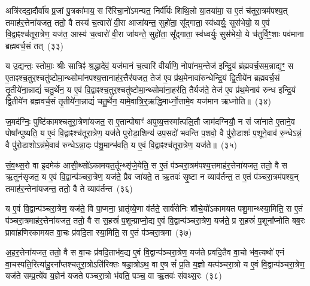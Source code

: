 {\anuvakamend[{लो॒कान्ग॑मयति॒ सावि॑द्वान्थ्सु॒शेवा॒ मावि॑श॒ यज॑मानं॒ द्वाद॑श च}]}

अत्रि॑रददा॒दौर्वा॑य प्र॒जां पु॒त्रका॑माय॒ स रि॑रिचा॒नो॑\-ऽमन्यत॒ निर्वी᳚र्यः शिथि॒लो या॒तया॑मा॒ स ए॒तं च॑तूरा॒त्रम॑पश्य॒त् तमाह॑र॒त्तेना॑यजत॒ ततो॒ वै तस्य॑ च॒त्वारो॑ वी॒रा आजा॑यन्त॒ सुहो॑ता॒ सू᳚द्गाता॒ स्व॑ध्वर्युः॒ सुस॑भेयो॒ य ए॒वं वि॒द्वाꣴश्च॑तूरा॒त्रेण॒ यज॑त॒ आस्य॑ च॒त्वारो॑ वी॒रा जा॑यन्ते॒ सुहो॑ता॒ सू᳚द्गाता॒ स्व॑ध्वर्युः॒ सुस॑भेयो॒ ये च॑तुर्वि॒ꣳ॒शाः पव॑माना ब्रह्मवर्च॒सं तत्~(३३)\ip

य उ॒द्यन्तः॒ स्तोमाः॒ श्रीः सात्रिꣴ॑ श्र॒द्धादे॑वं॒ यज॑मानं च॒त्वारि॑ वीर्याणि॒ नोपा॑नम॒न्तेज॑ इन्द्रि॒यं ब्र॑ह्मवर्च॒सम॒न्नाद्य॒ꣳ॒ स ए॒ताꣴश्च॒तुर॒श्चतु॑ष्टोमा॒न्थ्सोमा॑नपश्य॒त्तानाह॑र॒त्तैर॑यजत॒ तेज॑ ए॒व प्र॑थ॒मेनावा॑रुन्धेन्द्रि॒यं द्वि॒तीये॑न ब्रह्मवर्च॒सं तृ॒तीये॑ना॒न्नाद्यं॑ चतु॒र्थेन॒ य ए॒वं वि॒द्वाꣴश्च॒तुर॒श्चतु॑ष्टोमा॒न्थ्सोमा॑ना॒हर॑ति॒ तैर्यज॑ते॒ तेज॑ ए॒व प्र॑थ॒मेनाव॑ रुन्ध इन्द्रि॒यं द्वि॒तीये॑न ब्रह्मवर्च॒सं तृ॒तीये॑ना॒न्नाद्यं॑ चतु॒र्थेन॒ यामे॒वात्रि॒र्॒\mbox{}ऋद्धि॒मार्ध्नो॒त्तामे॒व यज॑मान ऋध्नोति॥~(३४)\ip

{\anuvakamend[{तत्तेज॑ ए॒वाष्टाद॑श च}]}

ज॒मद॑ग्निः॒ पुष्टि॑कामश्चतूरा॒त्रेणा॑यजत॒ स ए॒तान्पोषाꣳ॑ अपुष्य॒त्तस्मा᳚त्पलि॒तौ जाम॑दग्नियौ॒ न सं जा॑नाते ए॒ताने॒व पोषा᳚न्पुष्यति॒ य ए॒वं वि॒द्वाꣴश्च॑तूरा॒त्रेण॒ यज॑ते पुरोडा॒शिन्य॑ उप॒सदो॑ भवन्ति प॒शवो॒ वै पु॑रो॒डाशः॑ प॒शूने॒वाव॑ रु॒न्धे\-ऽन्नं॒ वै पु॑रो॒डाशो\-ऽन्न॑मे॒वाव॑ रुन्धे\-ऽन्ना॒दः प॑शु॒मान्भ॑वति॒ य ए॒वं वि॒द्वाꣴश्च॑तूरा॒त्रेण॒ यज॑ते॥~(३५)\ip

{\anuvakamend[{ज॒मद॑ग्निर॒ष्टाच॑त्वारिꣳशत्}]}

सं॒व॒थ्स॒रो वा इ॒दमेक॑ आसी॒थ्सो॑\-ऽकामयत॒र्तून्थ्सृ॑जे॒येति॒ स ए॒तं प॑ञ्चरा॒त्रम॑पश्य॒त्तमाह॑र॒त्तेना॑यजत॒ ततो॒ वै स ऋ॒तून॑सृजत॒ य ए॒वं वि॒द्वान्प॑ञ्चरा॒त्रेण॒ यज॑ते॒ प्रैव जा॑यते॒ त ऋ॒तवः॑ सृ॒ष्टा न व्याव॑र्तन्त॒ त ए॒तं प॑ञ्चरा॒त्रम॑पश्य॒न् तमाह॑र॒न्तेना॑यजन्त॒ ततो॒ वै ते व्याव॑र्तन्त~(३६)\ip

य ए॒वं वि॒द्वान्प॑ञ्चरा॒त्रेण॒ यज॑ते॒ वि पा॒प्मना॒ भ्रातृ॑व्ये॒णा व॑र्तते॒ सार्व॑सेनिः शौचे॒यो॑\-ऽकामयत पशु॒मान्थ्स्या॒मिति॒ स ए॒तं प॑ञ्चरा॒त्रमाह॑र॒त्तेना॑यजत॒ ततो॒ वै स स॒हस्रं॑ प॒शून्प्राप्नो॒द्य ए॒वं वि॒द्वान्प॑ञ्चरा॒त्रेण॒ यज॑ते॒ प्र स॒हस्रं॑ प॒शूना᳚प्नोति बब॒रः प्रावा॑हणिरकामयत वा॒चः प्र॑वदि॒ता स्या॒मिति॒ स ए॒तं प॑ञ्चरा॒त्रमा~(३७)\ip

अ॒ह॒र॒त्तेना॑यजत॒ ततो॒ वै स वा॒चः प्र॑वदि॒ताभ॑व॒द्य ए॒वं वि॒द्वान्प॑ञ्चरा॒त्रेण॒ यज॑ते प्रवदि॒तैव वा॒चो भ॑व॒त्यथो॑ एनं वा॒चस्पति॒रित्या॑हु॒रना᳚प्तश्चतूरा॒त्रो\-ऽति॑रिक्तः षड्रा॒त्रो\-ऽथ॒ वा ए॒ष सं॑ प्र॒ति य॒ज्ञो यत्प॑ञ्चरा॒त्रो य ए॒वं वि॒द्वान्प॑ञ्चरा॒त्रेण॒ यज॑ते सम्प्र॒त्ये॑व य॒ज्ञेन॑ यजते पञ्चरा॒त्रो भ॑वति॒ पञ्च॒ वा ऋ॒तवः॑ संवथ्स॒रः~(३८)\ip

